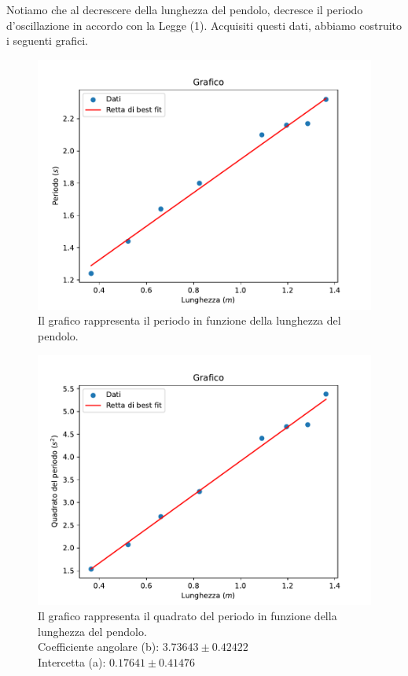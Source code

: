 \documentclass[11pt]{article}
\begin{document}
Notiamo che al decrescere della lunghezza del pendolo, decresce il periodo d'oscillazione in accordo con la Legge (1).
Acquisiti questi dati, abbiamo costruito i seguenti grafici.

\begin{figure}[H]
  \centering
  \includegraphics[width=1\textwidth]{grafico1p2.pdf}
  \caption{Il grafico rappresenta il periodo in funzione della lunghezza del pendolo.}
\end{figure}

\begin{figure}[H]
  \centering
  \includegraphics[width=1\textwidth]{grafico2p2.pdf}
  \caption{Il grafico rappresenta il quadrato del periodo in funzione della lunghezza del pendolo.\\ 
  Coefficiente angolare (b): $3.73643\pm 0.42422$ \\
  Intercetta (a): $0.17641\pm 0.41476$}
\end{figure}
\end{document}
